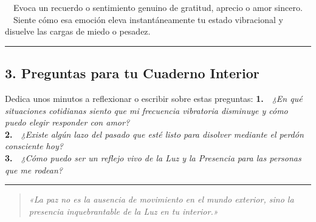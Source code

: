 \noindent\textbullet~~Evoca un recuerdo o sentimiento genuino de gratitud, aprecio o amor sincero.\\

\noindent\textbullet~~Siente cómo esa emoción eleva instantáneamente tu estado vibracional y disuelve las cargas de miedo o pesadez.\\



\vspace{0.4cm}
\begin{center}
\rule{0.35\textwidth}{0.4pt}
\end{center}
\vspace{0.4cm}


\subsection*{3. Preguntas para tu Cuaderno Interior}
Dedica unos minutos a reflexionar o escribir sobre estas preguntas:
\noindent\textbf{1.}~~\textit{¿En qué situaciones cotidianas siento que mi frecuencia vibratoria disminuye y cómo puedo elegir responder con amor?}\\

\noindent\textbf{2.}~~\textit{¿Existe algún lazo del pasado que esté listo para disolver mediante el perdón consciente hoy?}\\

\noindent\textbf{3.}~~\textit{¿Cómo puedo ser un reflejo vivo de la Luz y la Presencia para las personas que me rodean?}\\



\vspace{0.4cm}
\begin{center}
\rule{0.35\textwidth}{0.4pt}
\end{center}
\vspace{0.4cm}




\begin{quote}
\itshape \textit{«La paz no es la ausencia de movimiento en el mundo exterior, sino la presencia inquebrantable de la Luz en tu interior.»}
\end{quote}